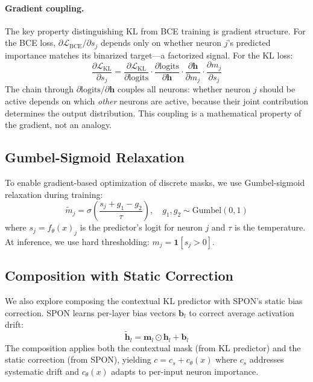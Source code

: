 \documentclass[11pt]{article}
\begin{document}
\paragraph{Gradient coupling.} The key property distinguishing KL from BCE training is gradient structure. For the BCE loss, $\partial \mathcal{L}_{\text{BCE}} / \partial s_j$ depends only on whether neuron $j$'s predicted importance matches its binarized target---a factorized signal. For the KL loss:
\begin{equation}
\frac{\partial \mathcal{L}_{\text{KL}}}{\partial s_j} = \frac{\partial \mathcal{L}_{\text{KL}}}{\partial \text{logits}} \cdot \frac{\partial \text{logits}}{\partial \mathbf{h}} \cdot \frac{\partial \mathbf{h}}{\partial m_j} \cdot \frac{\partial m_j}{\partial s_j}
\end{equation}
The chain through $\partial \text{logits}/\partial \mathbf{h}$ couples all neurons: whether neuron $j$ should be active depends on which \emph{other} neurons are active, because their joint contribution determines the output distribution. This coupling is a mathematical property of the gradient, not an analogy.

\subsection{Gumbel-Sigmoid Relaxation}

To enable gradient-based optimization of discrete masks, we use Gumbel-sigmoid relaxation during training:
\begin{equation}
\tilde{m}_j = \sigma\!\left(\frac{s_j + g_1 - g_2}{\tau}\right), \quad g_1, g_2 \sim \text{Gumbel}(0,1)
\end{equation}
where $s_j = f_\theta(x)_j$ is the predictor's logit for neuron $j$ and $\tau$ is the temperature. At inference, we use hard thresholding: $m_j = \mathbf{1}[s_j > 0]$.

\subsection{Composition with Static Correction}

We also explore composing the contextual KL predictor with SPON's static bias correction. SPON learns per-layer bias vectors $\mathbf{b}_l$ to correct average activation drift:
\begin{equation}
\tilde{\mathbf{h}}_l = \mathbf{m}_l \odot \mathbf{h}_l + \mathbf{b}_l
\end{equation}
The composition applies both the contextual mask (from KL predictor) and the static correction (from SPON), yielding $c = c_s + c_\theta(x)$ where $c_s$ addresses systematic drift and $c_\theta(x)$ adapts to per-input neuron importance.
\end{document}
